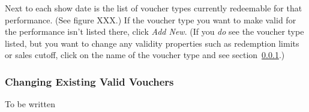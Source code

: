 Next to each show date is the list of voucher types currently redeemable
for that performance.  (See figure XXX.)  If the voucher type you want
to make valid for the performance isn't listed there, click \emph{Add
  New}.  (If you \emph{do} see the voucher type listed, but you want to
change any validity properties such as redemption limits or sales
cutoff, click on the name of the voucher type and see
section~\ref{sec:changingvalidvoucher}.) 


\subsubsection{Changing Existing Valid Vouchers}
\label{sec:changingvalidvoucher}

To be written
